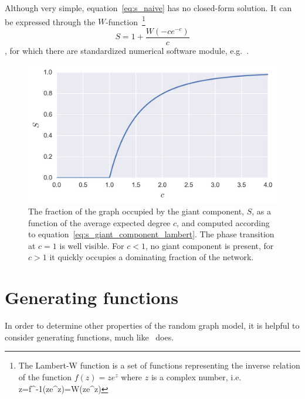 \noindent Although very simple, equation~\ref{eq:s_naive} has no closed-form solution.
It can be expressed through the \Lambert $W$-function~\footnote{The Lambert-W function is a set of functions representing the inverse relation of the function $f(z) = z e^{z}$ where $z$ is a complex number, i.e. {\displaystyle\, z=f^{-1}(ze^{z})=W(ze^{z})}}
\begin{equation}
S = 1 + \frac{W(-c e^{-c})}{c}
\label{eq:s_giant_component_lambert}
\end{equation}
\noindent, for which there are standardized numerical software module, e.g.~\cite{sympy}.

\begin{figure}[tb]
	\centering
	\includegraphics[]{figures/2_s_as_function_of_c.png}
	\caption[Fraction of the graph occupied by the giant component as a function of the expected average degree]{The fraction of the graph occupied by the giant component, $S$, as a function of the average expected degree $c$, and computed according to equation~\ref{eq:s_giant_component_lambert}. The phase transition at $c=1$ is well visible. For $c < 1$, no giant component is present, for $c>1$ it quickly occupies a dominating fraction of the network.}
	\label{fig:s_as_function_of_c}
\end{figure}



\section{Generating functions} %
\label{sec:generating_functions}

In order to determine other properties of the random graph model, it is helpful to consider generating functions, much like~\cite{Newman:zFi032Kd} does.

